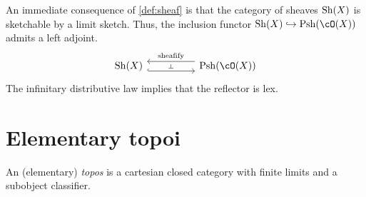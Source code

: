 \documentclass[article,10pt,oneside]{memoir}
\begin{document}
An immediate consequence of \cref{def:sheaf} is that the category of sheaves $\operatorname{Sh}(X)$ is sketchable by a limit sketch.
Thus, the inclusion functor $\Sh(X) \into \Psh(\cO(X))$ admits a left adjoint.
\[\begin{tikzcd}
    {\Sh(X)} && {\Psh(\cO(X))}
    \arrow[""{name=0, anchor=center, inner sep=0}, shift right=2, hook, from=1-1, to=1-3]
    \arrow[""{name=1, anchor=center, inner sep=0}, "{\text{sheafify}}"', shift right=2, from=1-3, to=1-1]
    \arrow["\dashv"{anchor=center, rotate=-90}, draw=none, from=1, to=0]
  \end{tikzcd}\]
The infinitary distributive law implies that the reflector is lex.

\section{Elementary topoi}
\label{sec:elementary-topoi}

\begin{defn}
  An (elementary) \emph{topos} is a cartesian closed category with finite limits and a subobject classifier.
\end{defn}
\end{document}
